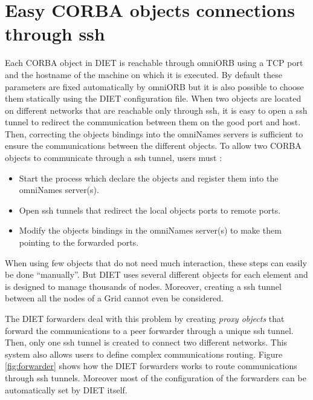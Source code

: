 \section{Easy CORBA objects connections through ssh}
Each CORBA object in DIET is reachable through omniORB using a TCP
port and the hostname of the machine on which it is executed. By
default these parameters are fixed automatically by omniORB but it is
also possible to choose them statically using the DIET configuration
file.
When two objects are located on different networks that are reachable
only through ssh, it is easy to open a ssh tunnel to redirect the
communication between them on the good port and host. Then, correcting
the objects bindings into the omniNames servers is sufficient to ensure
the communications between the different objects. To allow two
CORBA objects to communicate through a ssh tunnel, users must :
\begin{itemize}
\item Start the process which declare the objects and register them
  into the omniNames server(s).
\item Open ssh tunnels that redirect the local objects ports to
  remote ports.
\item Modify the objects bindings in the omniNames server(s) to make
  them pointing to the forwarded ports.
\end{itemize}

When using few objects that do not need much interaction, these steps
can easily be done ``manually''. But DIET uses several different
objects for each element and is designed to manage thousands of nodes.
Moreover, creating a ssh tunnel between all the nodes of a Grid
cannot even be considered.

The DIET forwarders deal with this problem by creating \textit{proxy
  objects} that forward the communications to a peer forwarder through
a unique ssh tunnel. Then, only one ssh tunnel is created to connect
two different networks. This system also allows users to define complex
communications routing. Figure \ref{fig:forwarder} shows how the DIET
forwarders works to route communications through ssh tunnels. Moreover
most of the configuration of the forwarders can be automatically set
by DIET itself.

